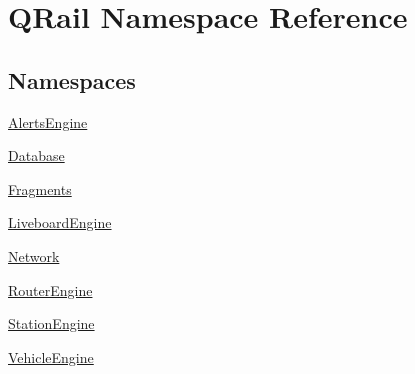 \hypertarget{namespaceQRail}{}\section{Q\+Rail Namespace Reference}
\label{namespaceQRail}
\subsection*{Namespaces}
\begin{DoxyCompactItemize}
\item 
 \mbox{\hyperlink{namespaceQRail_1_1AlertsEngine}{Alerts\+Engine}}
\item 
 \mbox{\hyperlink{namespaceQRail_1_1Database}{Database}}
\item 
 \mbox{\hyperlink{namespaceQRail_1_1Fragments}{Fragments}}
\item 
 \mbox{\hyperlink{namespaceQRail_1_1LiveboardEngine}{Liveboard\+Engine}}
\item 
 \mbox{\hyperlink{namespaceQRail_1_1Network}{Network}}
\item 
 \mbox{\hyperlink{namespaceQRail_1_1RouterEngine}{Router\+Engine}}
\item 
 \mbox{\hyperlink{namespaceQRail_1_1StationEngine}{Station\+Engine}}
\item 
 \mbox{\hyperlink{namespaceQRail_1_1VehicleEngine}{Vehicle\+Engine}}
\end{DoxyCompactItemize}
